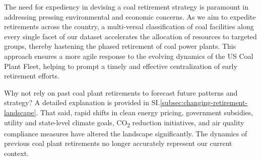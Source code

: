 The need for expediency in devising a coal retirement strategy is paramount in addressing pressing environmental and economic concerns. As we aim to expedite retirements across the country, 
a multi-versal classification of coal facilities along every single facet of our dataset accelerates the allocation of resources to targeted groups, thereby hastening the phased retirement of 
coal power plants. This approach ensures a more agile response to the evolving dynamics of the US Coal Plant Fleet, helping to prompt a timely and effective centralization of early retirement efforts.

Why not rely on past coal plant retirements to forecast future patterns and strategy? A detailed explanation is provided in SI.\ref{subsec:changing-retirement-landscape}. 
That said, rapid shifts in clean energy pricing, government subsidies, utility and state-level climate goals, CO\textsubscript{2} reduction initiatives, and air quality 
compliance measures have altered the landscape significantly. The dynamics of previous coal plant retirements no longer accurately represent our current context.





